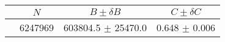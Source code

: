 \begin{tabular}{lccc}
\hline
    &   $N$   & $B \pm \delta B$  &  $C \pm \delta C$ \\
\hline
                               & 6247969    & 603804.5   $\pm$ 25470.0 & 0.648      $\pm$ 0.006 \\
\hline
\end{tabular}
